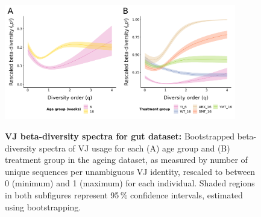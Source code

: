 \begin{figure}
\centering
\includegraphics[width = 0.9\textwidth]{_Figures/png/igseq-gut-VJ-diversity-beta}
\begin{subfigure}{0em}
\label{fig:igseq-gut-VJ-diversity-beta-age}
\end{subfigure}
\begin{subfigure}{0em}
\label{fig:igseq-gut-VJ-diversity-beta-groups}
\end{subfigure}
\caption[VJ beta-diversity spectra for \igseq gut dataset]{\textbf{VJ beta-diversity spectra for \igseq gut dataset:} Bootstrapped beta-diversity spectra of VJ usage for each (A) age group and (B) treatment group in the \igseq ageing dataset, as measured by number of unique sequences per unambiguous VJ identity, rescaled to between 0 (minimum) and 1 (maximum) for each individual. Shaded regions in both subfigures represent 95\,\% confidence intervals, estimated using bootstrapping.}
\label{fig:igseq-gut-VJ-diversity-beta}
\end{figure}

